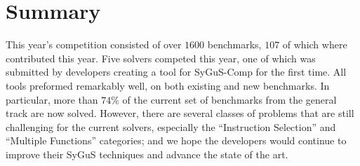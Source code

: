 \section{Summary}
\label{sec:discussion}

This year's competition consisted of over $1600$ benchmarks, $107$ of which where contributed this year.
Five solvers competed this year, one of which was submitted by developers creating a tool for SyGuS-Comp for the first time.
All tools preformed remarkably well, on both existing and new benchmarks.
In particular, more than $74$\% of the current set of benchmarks from the general track are now solved.
However, there are several classes of problems that are still challenging for the current solvers,
especially the ``Instruction Selection'' and ``Multiple Functions'' categories;
and we hope the developers would continue to improve their SyGuS techniques and advance the state of the art.